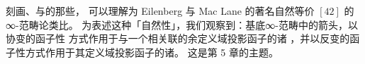 刻画\trAdjunction{}、\trLimit{}与\trColimit{}的那些\trFiberedEquivalence{}，%
可以理解为 Eilenberg 与 Mac Lane 的著名自然等价 $[42]$ 的∞-范畴论类比。%
为表述这种「自然性」，我们观察到：基底∞-范畴中的箭头，以协变的函子性%
方式作用于与一个\trCommaInfinityCategory{}相关联的余定义域投影函子的诸%
\trFiber{}，并以反变的函子性方式作用于其定义域投影函子的诸\trFiber{}。%
这是第 5 章的主题。

